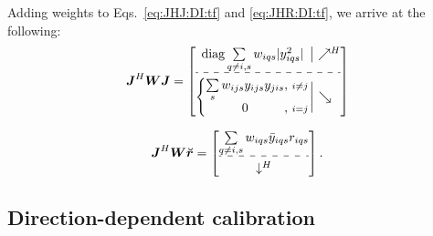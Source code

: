 \documentclass[useAMS,usenatbib]{mn2e}
\makeatletter
\newcommand{\mat}[1]{{\bmath{#1}}}
\newcommand{\JJ}{\mat{J}} %
\newcommand{\MM}{\mat{M}}
\newcommand{\GG}{\mat{G}}
\newcommand{\Matrix}[2]{\left [ \begin{array}{@{}#1@{}}#2\end{array} \right ]}
\newcommand{\Stack}[1]{\begin{array}{@{}c@{}}#1\end{array}}
\newcommand{\AUG}[1]{\bmath{\breve{#1}}}
\newcommand{\Rr}{\AUG{r}}
\numberwithin{equation}{section}
\providecommand{\DIFaddbegin}{} %
\providecommand{\DIFaddend}{} %
\providecommand{\DIFdelbegin}{} %
\providecommand{\DIFdelend}{} %
\makeatother
\begin{document}
Adding weights to Eqs.~\ref{eq:JHJ:DI:tf} and \ref{eq:JHR:DI:tf}, we arrive at the following:
\begin{equation}
\label{eq:JHJ:DI:tfw}
\JJ^H\mat{W}\JJ = 
\JHJblocks{
  \mathrm{diag} \sum\limits_{q\ne i,s} w_{iqs} |y^2_{iqs}|
}{
  \left \{ 
  \begin{array}{@{}c@{,~}c@{}}
   \sum\limits_{s} w_{ijs} y_{ijs}y_{jis}&{\scriptstyle i\ne j} \\
   0 &{\scriptstyle i=j}
  \end{array} \right . 
}
\DIFaddend \end{equation}

\begin{equation}
\label{eq:JHR:DI:tfw}
\JJ^H\mat{W}\Rr 
= \DIFdelbegin %
\DIFdelend \DIFaddbegin \Matrix{c}{
\sum\limits_{q\ne i,s} w_{iqs} \bar{y}_{iqs} r_{iqs}   \\
\hdashline\\[-8pt]
\downarrow^H
}\DIFaddend .
\end{equation}


\newcommand{\GGd}{\GG^{(d)}}
\newcommand{\GGdH}{\GG^{(d)H}}
\newcommand{\MMd}{\MM^{(d)}}
\newcommand{\YYd}{\YY^{(d)}}
\newcommand{\YYdH}{\YY^{(d)H}}
\newcommand{\YYc}{\YY^{(c)}}
\newcommand{\YYcH}{\YY^{(c)H}}
\newcommand{\ggd}{g^{(d)}}
\newcommand{\ggdH}{\bar{g}^{(d)}}
\newcommand{\ggc}{g^{(c)}}
\newcommand{\ggcH}{\bar{g}^{(c)}}
\newcommand{\mmc}{m^{(c)}}
\newcommand{\mmd}{m^{(d)}}
\newcommand{\mmcH}{\bar{m}^{(c)}}
\newcommand{\mmdH}{\bar{m}^{(d)}}
\newcommand{\yyd}{y^{(d)}}
\newcommand{\yydH}{\bar{y}^{(d)}}
\newcommand{\yyc}{y^{(c)}}
\newcommand{\yycH}{\bar{y}^{(c)}}


\subsection{Direction-dependent calibration}
\label{sec:unpol:DD}
\end{document}
